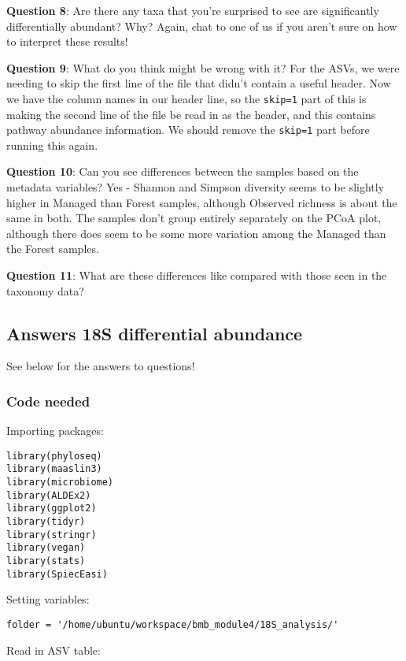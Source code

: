 \documentclass[
]{book}
\begin{document}
\textbf{Question 8}: Are there any taxa that you're surprised to see are significantly differentially abundant? Why?
Again, chat to one of us if you aren't sure on how to interpret these results!

\textbf{Question 9}: What do you think might be wrong with it?
For the ASVs, we were needing to skip the first line of the file that didn't contain a useful header. Now we have the column names in our header line, so the \texttt{skip=1} part of this is making the second line of the file be read in as the header, and this contains pathway abundance information. We should remove the \texttt{skip=1} part before running this again.

\textbf{Question 10}: Can you see differences between the samples based on the metadata variables?
Yes - Shannon and Simpson diversity seems to be slightly higher in Managed than Forest samples, although Observed richness is about the same in both. The samples don't group entirely separately on the PCoA plot, although there does seem to be some more variation among the Managed than the Forest samples.

\textbf{Question 11}: What are these differences like compared with those seen in the taxonomy data?

\subsection{Answers 18S differential abundance}\label{answers-18s-differential-abundance}

See below for the answers to questions!

\subsubsection{Code needed}\label{code-needed}

Importing packages:

\begin{verbatim}
library(phyloseq)
library(maaslin3)
library(microbiome)
library(ALDEx2)
library(ggplot2)
library(tidyr)
library(stringr)
library(vegan)
library(stats)
library(SpiecEasi)
\end{verbatim}

Setting variables:

\begin{verbatim}
folder = '/home/ubuntu/workspace/bmb_module4/18S_analysis/'
\end{verbatim}

Read in ASV table:
\end{document}
